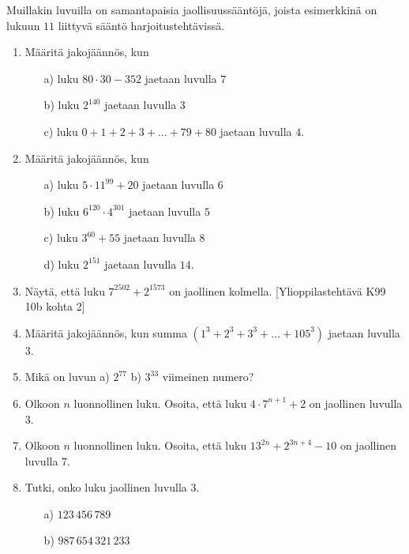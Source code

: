 Muillakin luvuilla on samantapaisia jaollisuussääntöjä, joista esimerkkinä on lukuun $11$ liittyvä sääntö harjoitustehtävissä.




\Harjoitustehtavat

\begin{enumerate}

\item Määritä jakojäännös, kun
\begin{itemize}
\item[a)] luku $80 \cdot 30 - 352$ jaetaan luvulla $7$
\item[b)] luku $2^{140}$ jaetaan luvulla $3$
\item[c)] luku $0+1+2+3+ \ldots + 79 + 80$ jaetaan luvulla $4$.
\end{itemize}

\item Määritä jakojäännös, kun
\begin{itemize}
\item[a)] luku $5 \cdot 11^{99} + 20$ jaetaan luvulla $6$
\item[b)] luku $6^{120} \cdot 4^{301}$ jaetaan luvulla $5$
\item[c)] luku $3^{60} + 55$ jaetaan luvulla $8$
\item[d)] luku $2^{151}$ jaetaan luvulla $14$.
\end{itemize}

\item
Näytä, että luku $7^{2502} + 2^{1573}$ on jaollinen kolmella. [Ylioppilastehtävä K99 10b kohta 2]

\item Määritä jakojäännös, kun summa $(1^3 + 2^3 + 3^3 + \ldots + 105^3)$ jaetaan luvulla $3$.

\item Mikä on luvun a) $2^{77}$ b) $3^{33}$ viimeinen numero?

\item Olkoon $n$ luonnollinen luku. Osoita, että luku $4\cdot 7^{n+1}+2$ on jaollinen luvulla $3$.

\item Olkoon $n$ luonnollinen luku. Osoita, että luku $13^{2n} + 2^{3n+4} - 10$ on jaollinen luvulla $7$.

\item
Tutki, onko luku jaollinen luvulla $3$.
\begin{itemize}
\item[a)] $123\, 456\, 789$
\item[b)] $987\, 654\, 321\, 233$
\end{itemize}


\end{enumerate}
